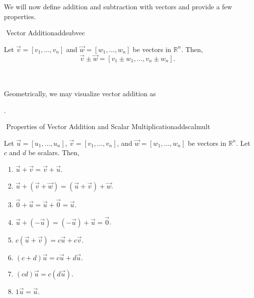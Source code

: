     \pagebreak
    \vphantom
    \\
    \\
    We will now define addition and subtraction with vectors and provide a few properties.
    \begin{definition}{\Stop\,\,Vector Addition}{addsubvec}

        Let \(\vec{v}=[v_1,\ldots,v_n]\) and \(\vec{w}=[w_1,\ldots,w_n]\) be vectors in \(\mathbb{R}^n\). Then,
        \begin{equation*}
            \vec{v}\pm\vec{w}=[v_1\pm w_1,\ldots,v_n\pm w_n].
        \end{equation*}
        
    \end{definition}
    \vphantom
    \\
    \\
    Geometrically, we may visualize vector addition as
    \begin{center}
    .
    \end{center}
    \begin{theorem}{\Stop\,\,Properties of Vector Addition and Scalar Multiplication}{addscalmult}

        Let \(\vec{u}=[u_1,\ldots,u_n]\), \(\vec{v}=[v_1,\ldots,v_n]\), and \(\vec{w}=[w_1,\ldots,w_n]\) be vectors in \(\mathbb{R}^n\). Let \(c\) and \(d\) be scalars. Then,
        \begin{enumerate}
            \item \(\vec{u}+\vec{v}=\vec{v}+\vec{u}\).
            \item \(\vec{u}+(\vec{v}+\vec{w})=(\vec{u}+\vec{v})+\vec{w}\).
            \item \(\vec{0}+\vec{u}=\vec{u}+\vec{0}=\vec{u}\).
            \item \(\vec{u}+(-\vec{u})=(-\vec{u})+\vec{u}=\vec{0}\).
            \item \(c(\vec{u}+\vec{v})=c\vec{u}+c\vec{v}\).
            \item \((c+d)\vec{u}=c\vec{u}+d\vec{u}\).
            \item \((cd)\vec{u}=c(d\vec{u})\).
            \item \(1\vec{u}=\vec{u}\).
        \end{enumerate}
        
    \end{theorem}
